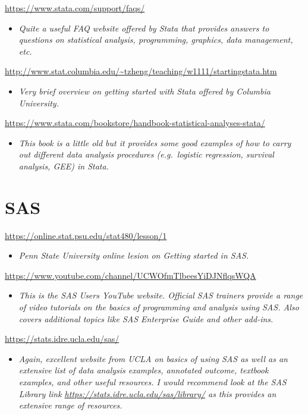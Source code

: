 \documentclass[
]{book}
\providecommand{\tightlist}{%
  \setlength{\itemsep}{0pt}\setlength{\parskip}{0pt}}
\begin{document}
\url{https://www.stata.com/support/faqs/}

\begin{itemize}
\tightlist
\item
  \emph{Quite a useful FAQ website offered by Stata that provides answers to questions on statistical analysis, programming, graphics, data management, etc.}
\end{itemize}

\url{http://www.stat.columbia.edu/~tzheng/teaching/w1111/startingstata.htm}

\begin{itemize}
\tightlist
\item
  \emph{Very brief overview on getting started with Stata offered by Columbia University.}
\end{itemize}

\url{https://www.stata.com/bookstore/handbook-statistical-analyses-stata/}

\begin{itemize}
\tightlist
\item
  \emph{This book is a little old but it provides some good examples of how to carry out different data analysis procedures (e.g.~logistic regression, survival analysis, GEE) in Stata.}
\end{itemize}

\section{SAS}\label{sas}

\url{https://online.stat.psu.edu/stat480/lesson/1}

\begin{itemize}
\tightlist
\item
  \emph{Penn State University online lesion on Getting started in SAS.}
\end{itemize}

\url{https://www.youtube.com/channel/UCWOfmTlbeesYiDJNflqsWQA}

\begin{itemize}
\tightlist
\item
  \emph{This is the SAS Users YouTube website. Official SAS trainers provide a range of video tutorials on the basics of programming and analysis using SAS. Also covers additional topics like SAS Enterprise Guide and other add-ins.}
\end{itemize}

\url{https://stats.idre.ucla.edu/sas/}

\begin{itemize}
\tightlist
\item
  \emph{Again, excellent website from UCLA on basics of using SAS as well as an extensive list of data analysis examples, annotated outcome, textbook examples, and other useful resources. I would recommend look at the SAS Library link \url{https://stats.idre.ucla.edu/sas/library/} as this provides an extensive range of resources.}
\end{itemize}
\end{document}
